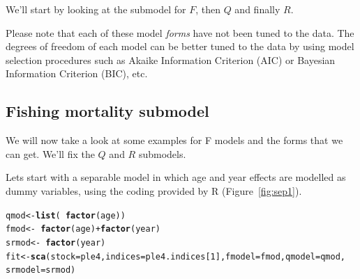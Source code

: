 \documentclass[a4paper,english,10pt]{article}\usepackage[]{graphicx}\usepackage[]{color}
\makeatletter
\newcommand{\hlnum}[1]{\textcolor[rgb]{0.686,0.059,0.569}{#1}}%
\newcommand{\hlopt}[1]{\textcolor[rgb]{0,0,0}{#1}}%
\newcommand{\hlstd}[1]{\textcolor[rgb]{0.345,0.345,0.345}{#1}}%
\newcommand{\hlkwb}[1]{\textcolor[rgb]{0.69,0.353,0.396}{#1}}%
\newcommand{\hlkwc}[1]{\textcolor[rgb]{0.333,0.667,0.333}{#1}}%
\newcommand{\hlkwd}[1]{\textcolor[rgb]{0.737,0.353,0.396}{\textbf{#1}}}%
\newenvironment{kframe}{%
 \def\at@end@of@kframe{}%
 \ifinner\ifhmode%
  \def\at@end@of@kframe{\end{minipage}}%
  \begin{minipage}{\columnwidth}%
 \fi\fi%
 \def\FrameCommand##1{\hskip\@totalleftmargin \hskip-\fboxsep
 \colorbox{shadecolor}{##1}\hskip-\fboxsep
     \hskip-\linewidth \hskip-\@totalleftmargin \hskip\columnwidth}%
 \MakeFramed {\advance\hsize-\width
   \@totalleftmargin\z@ \linewidth\hsize
   \@setminipage}}%
 {\par\unskip\endMakeFramed%
 \at@end@of@kframe}
\newenvironment{knitrout}{}{} %
\makeatother
\begin{document}
We'll start by looking at the submodel for $F$, then $Q$ and finally $R$.

Please note that each of these model \emph{forms} have not been tuned to the data. The degrees of freedom of each model can be better tuned to the data by using model selection procedures such as Akaike Information Criterion (AIC) or Bayesian Information Criterion (BIC), etc.

\subsection{Fishing mortality submodel}

We will now take a look at some examples for F models and the forms that we can get. We'll fix the $Q$ and $R$ submodels. 

Lets start with a separable model in which age and year effects are modelled as dummy variables, using the  coding provided by R (Figure~\ref{fig:sep1}). 

\begin{knitrout}
\color{fgcolor}\begin{kframe}
\begin{alltt}
\hlstd{qmod} \hlkwb{<-} \hlkwd{list}\hlstd{(}\hlopt{~}\hlkwd{factor}\hlstd{(age))}
\hlstd{fmod} \hlkwb{<-} \hlopt{~}\hlkwd{factor}\hlstd{(age)} \hlopt{+} \hlkwd{factor}\hlstd{(year)}
\hlstd{srmod} \hlkwb{<-} \hlopt{~}\hlkwd{factor}\hlstd{(year)}
\hlstd{fit} \hlkwb{<-} \hlkwd{sca}\hlstd{(}\hlkwc{stock} \hlstd{= ple4,} \hlkwc{indices} \hlstd{= ple4.indices[}\hlnum{1}\hlstd{],} \hlkwc{fmodel} \hlstd{= fmod,} \hlkwc{qmodel} \hlstd{= qmod,}
    \hlkwc{srmodel} \hlstd{= srmod)}
\end{alltt}
\end{kframe}
\end{knitrout}
\end{document}
